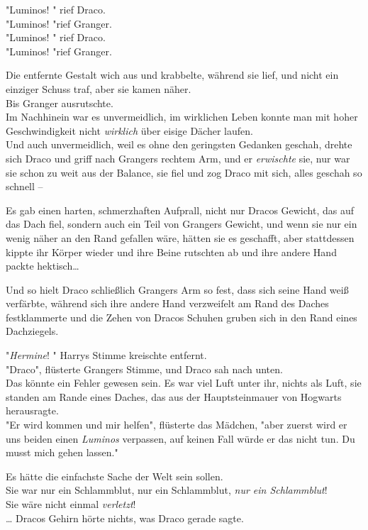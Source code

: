 {"Luminos! " rief Draco.\\ "Luminos! "rief Granger.\\ "Luminos! " rief Draco.\\ "Luminos! "rief Granger.

Die entfernte Gestalt wich aus und krabbelte, während sie lief, und nicht ein einziger Schuss traf, aber sie kamen näher.\\ Bis Granger ausrutschte.\\ Im Nachhinein war es unvermeidlich, im wirklichen Leben konnte man mit hoher Geschwindigkeit nicht \emph{wirklich} über eisige Dächer laufen.\\ Und auch unvermeidlich, weil es ohne den geringsten Gedanken geschah, drehte sich Draco und griff nach Grangers rechtem Arm, und er \emph{erwischte} sie, nur war sie schon zu weit aus der Balance, sie fiel und zog Draco mit sich, alles geschah so schnell --

Es gab einen harten, schmerzhaften Aufprall, nicht nur Dracos Gewicht, das auf das Dach fiel, sondern auch ein Teil von Grangers Gewicht, und wenn sie nur ein wenig näher an den Rand gefallen wäre, hätten sie es geschafft, aber stattdessen kippte ihr Körper wieder und ihre Beine rutschten ab und ihre andere Hand packte hektisch…

Und so hielt Draco schließlich Grangers Arm so fest, dass sich seine Hand weiß verfärbte, während sich ihre andere Hand verzweifelt am Rand des Daches festklammerte und die Zehen von Dracos Schuhen gruben sich in den Rand eines Dachziegels.

"\emph{Hermine}! " Harrys Stimme kreischte entfernt.\\ "Draco", flüsterte Grangers Stimme, und Draco sah nach unten.\\ Das könnte ein Fehler gewesen sein. Es war viel Luft unter ihr, nichts als Luft, sie standen am Rande eines Daches, das aus der Hauptsteinmauer von Hogwarts herausragte.\\ "Er wird kommen und mir helfen", flüsterte das Mädchen, "aber zuerst wird er uns beiden einen \emph{Luminos} verpassen, auf keinen Fall würde er das nicht tun. Du musst mich gehen lassen."

Es hätte die einfachste Sache der Welt sein sollen.\\ Sie war nur ein Schlammblut, nur ein Schlammblut, \emph{nur ein Schlammblut}!\\ Sie wäre nicht einmal \emph{verletzt}!\\ … Dracos Gehirn hörte nichts, was Draco gerade sagte.

}
